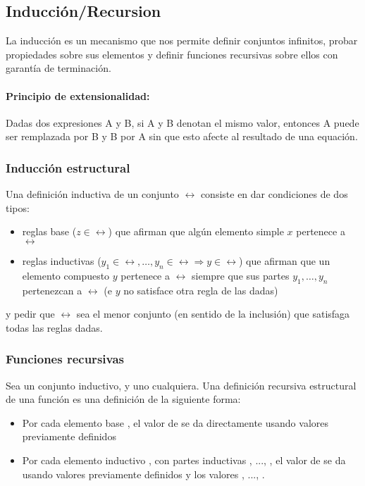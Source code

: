 \subsection{Inducción/Recursion}

La inducción es un mecanismo que nos permite definir conjuntos infinitos, probar propiedades sobre sus elementos y definir funciones recursivas sobre ellos con garantía de terminación.

\paragraph{Principio de extensionalidad:} Dadas dos expresiones A y B, si A y B denotan el mismo valor, entonces A puede ser remplazada por B y B por A sin que esto afecte al resultado de una equación.

\subsubsection{Inducción estructural}
Una definición inductiva de un conjunto $\rel$ consiste en dar condiciones de dos tipos:
\begin{itemize}
	\item reglas base ($z\in\rel$) que afirman que algún elemento simple $x$ pertenece a $\rel$
	\item reglas inductivas ($y_1\in\rel,\dots,y_n\in\rel\Rightarrow y\in\rel$) que afirman que un elemento compuesto $y$ pertenece a
	$\rel$ siempre que sus partes $y_1,\dots,y_n$ pertenezcan a $\rel$
	(e $y$ no satisface otra regla de las dadas)
\end{itemize}

y pedir que $\rel$ sea el menor conjunto (en sentido de
la inclusión) que satisfaga todas las reglas dadas.

\subsubsection{Funciones recursivas}
Sea  un conjunto inductivo, y  uno cualquiera. Una definición recursiva estructural de una función  es una definición de la siguiente forma:
\begin{itemize}
	\item Por cada elemento base , el valor de  se da directamente usando valores previamente definidos
	\item Por cada elemento inductivo , con partes inductivas , ..., , el valor de  se da usando valores previamente definidos y los valores , ..., .
\end{itemize}

